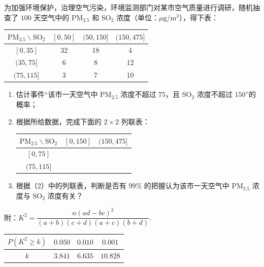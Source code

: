 \begin{problem}
为加强环境保护，治理空气污染，环境监测部门对某市空气质量进行调研，随机抽查了 \(100\) 天空气中的 \(\mathrm{PM}_{2.5}\) 和 \(\mathrm{SO}_2\) 浓度（单位：\(\mu\mathrm{g}/\mathrm{m}^3\)），得下表：

\begin{center}
\begin{tabular}{c|ccc}
\(\mathrm{PM}_{2.5}\backslash\mathrm{SO}_2\) & \([0,50]\) & \((50,150]\) & \((150,475]\) \\
\hline
\([0,35]\) & 32 & 18 & 4 \\
\((35,75]\) & 6 & 8 & 12 \\
\((75,115]\) & 3 & 7 & 10 \\
\end{tabular}
\end{center}

\begin{enumerate}
\item 估计事件“该市一天空气中 \(\mathrm{PM}_{2.5}\) 浓度不超过 \(75\)，且 \(\mathrm{SO}_2\) 浓度不超过 \(150\)”的概率；
\item 根据所给数据，完成下面的 \(2\times2\) 列联表：

\begin{center}
\begin{tabular}{c|cc}
\(\mathrm{PM}_{2.5}\backslash\mathrm{SO}_2\) & \([0,150]\) & \((150,475]\) \\
\hline
\([0,75]\) & & \\
\((75,115]\) & & \\
\end{tabular}
\end{center}

\item 根据（2）中的列联表，判断是否有 \(99\%\) 的把握认为该市一天空气中 \(\mathrm{PM}_{2.5}\) 浓度与 \(\mathrm{SO}_2\) 浓度有关？
\end{enumerate}

附：\(K^2=\dfrac{n(ad-bc)^2}{(a+b)(c+d)(a+c)(b+d)}\).

\begin{center}
\begin{tabular}{c|ccc}
\(P(K^2\geqslant k)\) & \(0.050\) & \(0.010\) & \(0.001\) \\
\hline
\(k\) & \(3.841\) & \(6.635\) & \(10.828\)
\end{tabular}
\end{center}
\end{problem}

